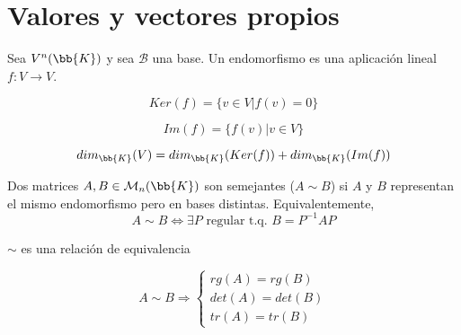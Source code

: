 \section{Valores y vectores propios}
\begin{definicion} [Endomorfismo]
    Sea $V^n(\bb{K})$ y sea $\mathcal{B}$ una base.
    Un endomorfismo es una aplicación lineal $f:V\to V$.
\end{definicion}
\begin{definicion} 
    \begin{equation*}
        Ker(f) = \{v\in V | f(v) = 0\}
    \end{equation*}
\end{definicion}
\begin{definicion} 
    \begin{equation*}
        Im(f) = \{f(v)| v\in V\}
    \end{equation*}
\end{definicion}
\begin{teo}
    \begin{equation*}
        dim_\bb{K}(V) = dim_\bb{K}(Ker(f)) + dim_\bb{K}(Im(f))
    \end{equation*}
\end{teo}

\begin{definicion}
    Dos matrices $A, B\in \mathcal{M}_n(\bb{K})$ son semejantes ($A\sim B$) si $A$ y $B$ representan el mismo endomorfismo pero en bases distintas. Equivalentemente,
    \begin{equation*}
        A \sim B \Longleftrightarrow \exists P \text{ regular t.q. } B = P^{-1}AP
    \end{equation*}
\end{definicion}
\begin{observacion}
$\sim$ es una relación de equivalencia
\end{observacion}
\begin{lema}
    \begin{equation*}
        A \sim B \Longrightarrow \left\{
        \begin{array}{c}
             rg(A) = rg(B) \\
             det(A) = det(B) \\
             tr(A) = tr(B)
        \end{array} \right.
    \end{equation*}
\end{lema}

